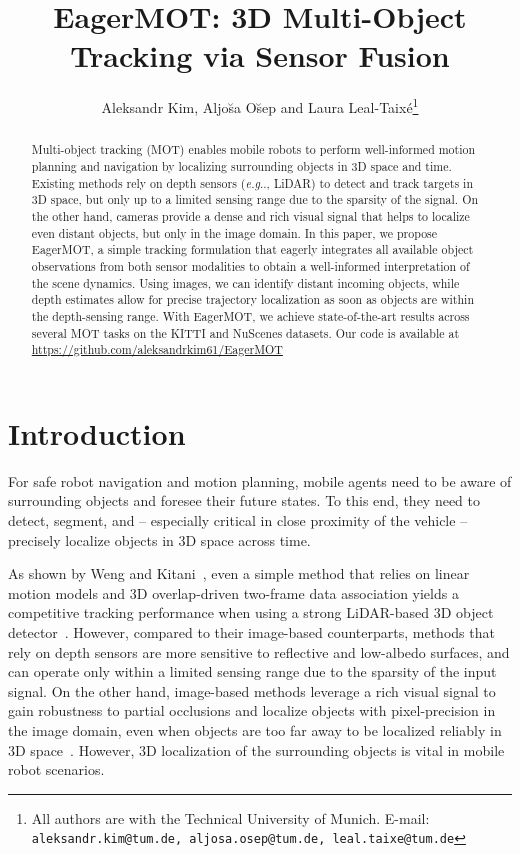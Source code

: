 \documentclass[letterpaper, 10 pt, conference]{ieeeconf}
\title{\LARGE \bf
EagerMOT: 3D Multi-Object Tracking via Sensor Fusion
}
\author{Aleksandr Kim, Aljo\u{s}a O\u{s}ep and Laura Leal-Taix{\'e}\thanks{
\scriptsize All authors are with the Technical University of Munich. E-mail: {\tt \scriptsize aleksandr.kim@tum.de, aljosa.osep@tum.de, leal.taixe@tum.de}}}
\makeatletter
\DeclareRobustCommand\onedot{\futurelet\@let@token\@onedot}
\def\@onedot{\ifx\@let@token.\else.\null\fi\xspace}
\def\eg{\emph{e.g}\onedot} \def\Eg{\emph{E.g}\onedot}
\makeatother
\begin{document}
\maketitle
\thispagestyle{empty}
\pagestyle{empty}

\begin{abstract}
Multi-object tracking (MOT) enables mobile robots to perform well-informed motion planning and navigation by localizing surrounding objects in 3D space and time. 
Existing methods rely on depth sensors (\eg, LiDAR) to detect and track targets in 3D space, but only up to a limited sensing range due to the sparsity of the signal. On the other hand, cameras provide a dense and rich visual signal that helps to localize even distant objects, but only in the image domain. 
In this paper, we propose EagerMOT, a simple tracking formulation that eagerly integrates all available object observations from both sensor modalities to obtain a well-informed interpretation of the scene dynamics. 
Using images, we can identify distant incoming objects, while depth estimates allow for precise trajectory localization as soon as objects are within the depth-sensing range. 
With EagerMOT, we achieve state-of-the-art results across several MOT tasks on the KITTI and NuScenes datasets. 
Our code is available at \url{https://github.com/aleksandrkim61/EagerMOT}
\end{abstract}


\section{Introduction}

For safe robot navigation and motion planning, mobile agents need to be aware of surrounding objects and foresee their future states. 
To this end, they need to detect, segment, and -- especially critical in close proximity of the vehicle -- precisely localize objects in 3D space across time. 

As shown by Weng and Kitani~\cite{Weng2020_AB3DMOT}, even a simple method that relies on linear motion models and 3D overlap-driven two-frame data association yields a competitive tracking performance when using a strong LiDAR-based 3D object detector~\cite{Shi19CVPR}.
However, compared to their image-based counterparts, methods that rely on depth sensors are more sensitive to reflective and low-albedo surfaces, and can operate only within a limited sensing range due to the sparsity of the input signal. 
On the other hand, image-based methods leverage a rich visual signal to gain robustness to partial occlusions and localize objects with pixel-precision in the image domain, even when objects are too far away to be localized reliably in 3D space~\cite{Voigtlaender19CVPR, Sharma18ICRA}. However, 3D localization of the surrounding objects is vital in mobile robot scenarios. 
\end{document}
